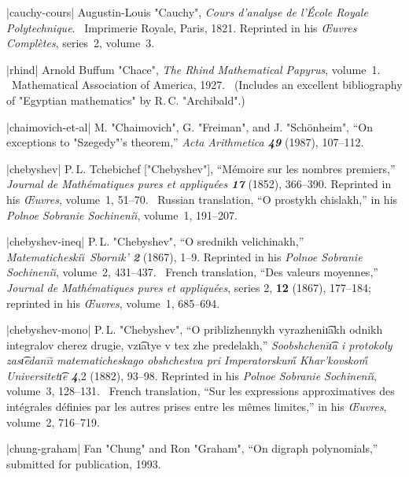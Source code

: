 \bib|cauchy-cours|%
Augustin-Louis "Cauchy",
{\sl Cours d'analyse de l'\'Ecole Royale Polytechnique}. \
Imprimerie Royale, Paris, 1821.
Reprinted in his {\sl \OE uvres Com\-pl\`etes}, series~2, volume~3.

\bib|rhind|%
Arnold Buffum "Chace", {\sl The Rhind Mathematical Papyrus}, volume~1. \
Mathematical Association of America, 1927. \ (Includes an excellent bibliography
of "Egyptian mathematics" by R.\,C. "Archibald".)

\bib|chaimovich-et-al|%
M. "Chaimovich", G. "Freiman", and J. "Sch\"onheim", ``On exceptions
to "Szegedy"'s theorem,'' {\sl Acta Arithmetica\/ \bf49} (1987), 107--112.

\bib|chebyshev|%
P.\,L. Tchebichef ["Chebyshev"], ``M\'emoire sur les nombres premiers,''
{\sl Journal de Math\'e\-ma\-tiques pures et appliqu\'ees\/ \bf17}
(1852), 366--390. Reprinted in his {\sl \OE uvres}, volume~1, 51--70. \
Russian translation, ``O prostykh chislakh,'' in his
{\sl Polnoe Sobranie Sochineni\u\i}, volume~1, 191--207.

\bib|chebyshev-ineq|%
P.\,L. "Chebyshev", ``O srednikh velichinakh,''
{\sl Matematicheski\u\i\ Sbornik'\/ \bf2} (1867), 1--9. Reprinted in his
{\sl Polnoe Sobranie Sochineni\u\i}, volume~2, 431--437. \ French translation,
``Des valeurs moyennes,'' {\sl Journal de Math\'e\-ma\-tiques
pures et appliqu\'ees}, series 2, {\bf12} (1867), 177--184; reprinted
in his {\sl \OE uvres}, volume~1, 685--694.

\bib|chebyshev-mono|%
P.\,L. "Chebyshev", ``O priblizhennykh vyrazheni\t{\i}akh odnikh integralov
cherez drugie, vz\t{\i}atye v tex zhe predelakh,''
{\sl Soobshchen\={\i}\t{\i}a i protokoly zas\t{\i}edan\={\i}\u{\i}
matematicheskago obshchestva pri Imperatorskum\H{} Khar'kovskom\H{}
Universitet\t{\i}e\/ \bf4},2 (1882), 93--98. Reprinted in his
{\sl Polnoe Sobranie Sochineni\u\i}, volume~3, 128--131. \ French translation,
``Sur les expressions approximatives des int\'egrales d\'efinies par les autres
prises entre les m\^emes limites,'' 
in his {\sl \OE uvres}, volume~2, 716--719.

\bib|chung-graham|%
Fan "Chung" and Ron "Graham", ``On digraph polynomials,''
submitted for publication, 1993.

